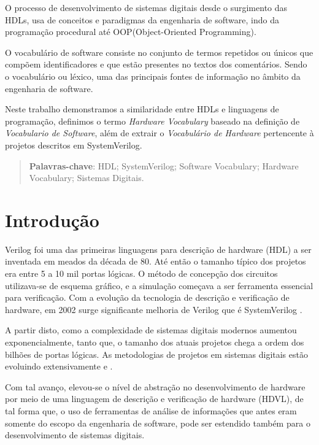 \documentclass[12pt, twocolumn, a4paper]{article}
\begin{document}
O processo de desenvolvimento de sistemas digitais desde o surgimento das HDLs, usa de conceitos e paradigmas da engenharia de software, indo da programação procedural até OOP(Object-Oriented Programming). %

O vocabulário de software consiste no conjunto de termos repetidos ou únicos que compõem identificadores e que estão presentes no textos dos comentários. Sendo o vocabulário ou léxico, uma das principais fontes de informação no âmbito da engenharia de software. %

Neste trabalho demonstramos a similaridade entre HDLs e linguagens de programação, definimos o termo \textit{Hardware Vocabulary} baseado na definição de \textit{Vocabulario de Software}, além de extrair o \textit{Vocabulário de Hardware} pertencente à projetos descritos em SystemVerilog. %
\begin{quote}
\textbf{Palavras-chave}: HDL; SystemVerilog; Software Vocabulary; Hardware Vocabulary; Sistemas Digitais.
\end{quote}

	\section{Introdução}

\quad Verilog foi uma das primeiras linguagens para descrição de hardware (HDL) a ser inventada em meados da década de 80. Até então o tamanho típico dos projetos era entre 5 a 10 mil portas lógicas. O método de concepção dos circuitos utilizava-se de esquema gráfico, e a simulação começava a ser  ferramenta essencial para verificação\cite{sutherland2006}. Com a evolução da tecnologia de descrição e verificação de hardware, em 2002 surge significante melhoria de Verilog que é SystemVerilog \cite{sutherland2006}. 

A partir disto, como a complexidade de sistemas digitais modernos aumentou exponencialmente, tanto que, o tamanho dos atuais projetos chega a ordem dos bilhões de portas lógicas. As metodologias de projetos em sistemas digitais estão evoluindo extensivamente \cite{Marc-Andre} e \cite{Hahanov2008}.

Com tal avanço, elevou-se o nível de abstração no desenvolvimento de hardware por meio de uma linguagem de descrição e verificação de hardware (HDVL), de tal forma que, o uso de ferramentas de análise de informações que antes eram somente do escopo da engenharia de software, pode ser estendido também para o desenvolvimento de sistemas digitais.
\end{document}
